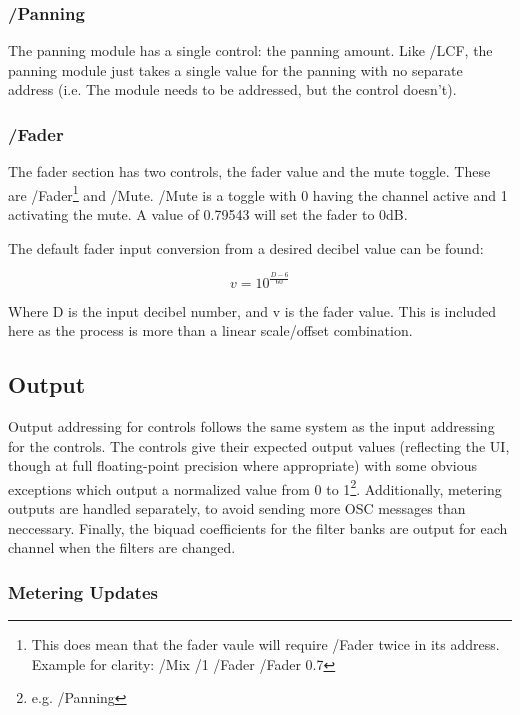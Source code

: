 \documentclass[letterpaper, 12pt, twosided, twocolumn]{article}
\begin{document}
\subsubsection{/Panning}

The panning module has a single control: the panning amount. Like /LCF, the panning module just takes a single value for the panning with no separate address (i.e. The module needs to be addressed, but the control doesn't).

\subsubsection{/Fader}

The fader section has two controls, the fader value and the mute toggle. These are /Fader\footnote{This does mean that the fader vaule will require /Fader twice in its address. Example for clarity: /Mix /1 /Fader /Fader 0.7} and /Mute. /Mute is a toggle with 0 having the channel active and 1 activating the mute. A value of 0.79543 will set the fader to 0dB.

The default fader input conversion from a desired decibel value can be found:

\begin{equation}
v = 10^{\frac{D - 6}{60}}
\end{equation}

Where D is the input decibel number, and v is the fader value. This is included here as the process is more than a linear scale/offset combination. 

\subsection{Output}

Output addressing for controls follows the same system as the input addressing for the controls. The controls give their expected output values (reflecting the UI, though at full floating-point precision where appropriate) with some obvious exceptions which output a normalized value from 0 to 1\footnote{e.g. /Panning}. Additionally, metering outputs are handled separately, to avoid sending more OSC messages than neccessary. Finally, the biquad coefficients for the filter banks are output for each channel when the filters are changed.

\subsubsection{Metering Updates}
\end{document}

